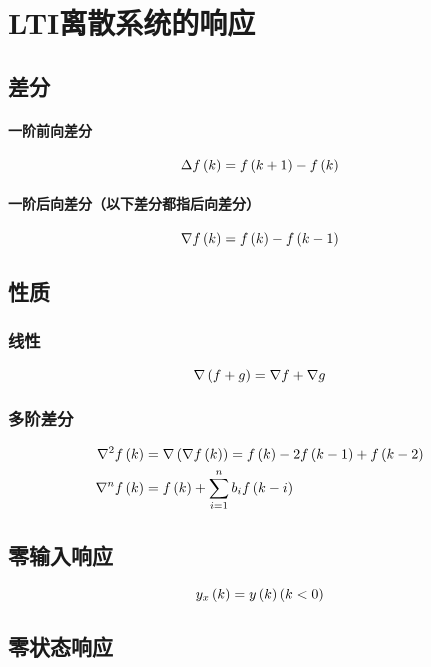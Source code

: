\documentclass{article}
\begin{document}
\section{LTI离散系统的响应}

\subsection{差分}

\paragraph{一阶前向差分}

\[\Delta f\left(k\right)=f\left(k+1\right)-f\left(k\right)\]

\paragraph{一阶后向差分（以下差分都指后向差分）}

\[\nabla f\left(k\right)=f\left(k\right)-f\left(k-1\right)\]

\subsection{性质}

\subsubsection{线性}

\[\nabla\left(f+g\right)=\nabla f+\nabla g\]

\subsubsection{多阶差分}

\[\begin{aligned}
        \nabla^2f\left(k\right) & =\nabla\left(\nabla f\left(k\right)\right)=f\left(k\right)-2f\left(k-1\right)+f\left(k-2\right) \\
        \nabla^nf\left(k\right) & =f\left(k\right)+\sum_{i=1}^nb_if\left(k-i\right)
    \end{aligned}\]

\subsection{零输入响应}

\[y_x\left(k\right)=y\left(k\right)\left(k<0\right)\]

\subsection{零状态响应}
\end{document}
